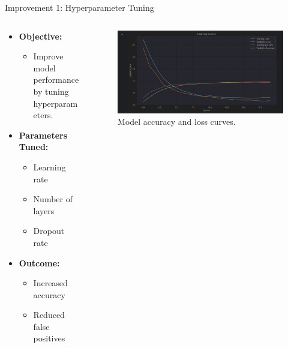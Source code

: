 \documentclass{beamer}
\begin{document}
\begin{frame}{Improvement 1: Hyperparameter Tuning}
  \begin{columns}
    \begin{column}{0.5\textwidth}
      \begin{itemize}
        \item \textbf{Objective:}
        \begin{itemize}
         \item Improve model performance by tuning hyperparameters.
        \end{itemize}
        \item \textbf{Parameters Tuned:}
          \begin{itemize}
            \item Learning rate
            \item Number of layers
            \item Dropout rate
          \end{itemize}
        \item \textbf{Outcome:}
          \begin{itemize}
            \item Increased accuracy
            \item Reduced false positives
          \end{itemize}
      \end{itemize}
    \end{column}
    \begin{column}{0.5\textwidth}
      \begin{figure}
        \includegraphics[width=\textwidth]{fig/tuned_learning_curves.jpeg}
        \caption{Model accuracy and loss curves.}
      \end{figure}
    \end{column}
  \end{columns}
\end{frame}
\end{document}
